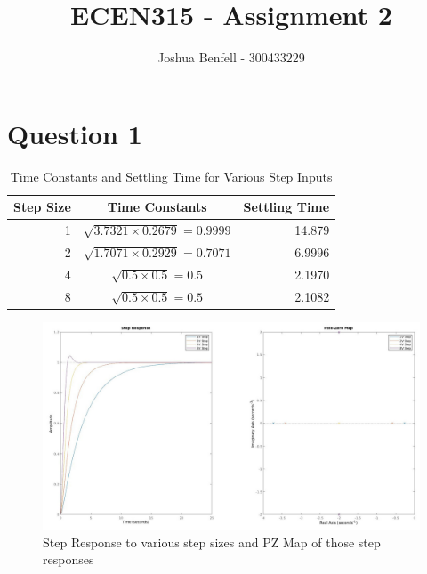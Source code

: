 \documentclass[a4paper, 12pt]{article}
\title{ECEN315 - Assignment 2}
\author{Joshua Benfell - 300433229}
\begin{document}
    \maketitle

    \section{Question 1}
        
        
        \begin{table}[!h]
            \caption{Time Constants and Settling Time for Various Step Inputs}
            \label{tab:q1}
            \centering
            \begin{tabular}{r|c|r}
                Step Size & Time Constants & Settling Time\\
                \hline
                1 & $\sqrt{3.7321 \times 0.2679} = 0.9999$ & 14.879\\
                2 & $\sqrt{1.7071 \times 0.2929} = 0.7071$ & 6.9996\\
                4 & $\sqrt{0.5 \times 0.5} = 0.5$ & 2.1970\\
                8 & $\sqrt{0.5 \times 0.5} = 0.5$ & 2.1082

            \end{tabular}
        \end{table}

        \begin{figure}[!h]
            \centering
            \includegraphics[width=\textwidth]{q1.jpg}
            \caption{Step Response to various step sizes and PZ Map of those step responses}
            \label{fig:q1}
        \end{figure}
\end{document}
